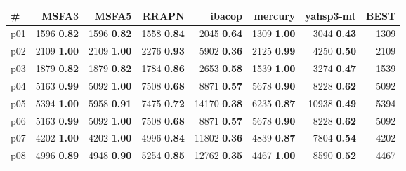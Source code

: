 \begin{tabular}{lrrrrrrr}
\toprule
\textbf{\#} & \textbf{MSFA3} & \textbf{MSFA5} & \textbf{RRAPN} & \textbf{ibacop} & \textbf{mercury} & \textbf{yahsp3-mt} & \textbf{BEST}\\
\midrule
\multicolumn{1}{l|}{p01} & {\footnotesize 1596} \textbf{0.82} & {\footnotesize 1596} \textbf{0.82} & {\footnotesize 1558} \textbf{0.84} & {\footnotesize 2045} \textbf{0.64} & {\footnotesize 1309} \textbf{1.00} & {\footnotesize 3044} \textbf{0.43} & \multicolumn{1}{|r}{1309}\\
\multicolumn{1}{l|}{p02} & {\footnotesize 2109} \textbf{1.00} & {\footnotesize 2109} \textbf{1.00} & {\footnotesize 2276} \textbf{0.93} & {\footnotesize 5902} \textbf{0.36} & {\footnotesize 2125} \textbf{0.99} & {\footnotesize 4250} \textbf{0.50} & \multicolumn{1}{|r}{2109}\\
\multicolumn{1}{l|}{p03} & {\footnotesize 1879} \textbf{0.82} & {\footnotesize 1879} \textbf{0.82} & {\footnotesize 1784} \textbf{0.86} & {\footnotesize 2653} \textbf{0.58} & {\footnotesize 1539} \textbf{1.00} & {\footnotesize 3274} \textbf{0.47} & \multicolumn{1}{|r}{1539}\\
\multicolumn{1}{l|}{p04} & {\footnotesize 5163} \textbf{0.99} & {\footnotesize 5092} \textbf{1.00} & {\footnotesize 7508} \textbf{0.68} & {\footnotesize 8871} \textbf{0.57} & {\footnotesize 5678} \textbf{0.90} & {\footnotesize 8228} \textbf{0.62} & \multicolumn{1}{|r}{5092}\\
\multicolumn{1}{l|}{p05} & {\footnotesize 5394} \textbf{1.00} & {\footnotesize 5958} \textbf{0.91} & {\footnotesize 7475} \textbf{0.72} & {\footnotesize 14170} \textbf{0.38} & {\footnotesize 6235} \textbf{0.87} & {\footnotesize 10938} \textbf{0.49} & \multicolumn{1}{|r}{5394}\\
\multicolumn{1}{l|}{p06} & {\footnotesize 5163} \textbf{0.99} & {\footnotesize 5092} \textbf{1.00} & {\footnotesize 7508} \textbf{0.68} & {\footnotesize 8871} \textbf{0.57} & {\footnotesize 5678} \textbf{0.90} & {\footnotesize 8228} \textbf{0.62} & \multicolumn{1}{|r}{5092}\\
\multicolumn{1}{l|}{p07} & {\footnotesize 4202} \textbf{1.00} & {\footnotesize 4202} \textbf{1.00} & {\footnotesize 4996} \textbf{0.84} & {\footnotesize 11802} \textbf{0.36} & {\footnotesize 4839} \textbf{0.87} & {\footnotesize 7804} \textbf{0.54} & \multicolumn{1}{|r}{4202}\\
\multicolumn{1}{l|}{p08} & {\footnotesize 4996} \textbf{0.89} & {\footnotesize 4948} \textbf{0.90} & {\footnotesize 5254} \textbf{0.85} & {\footnotesize 12762} \textbf{0.35} & {\footnotesize 4467} \textbf{1.00} & {\footnotesize 8590} \textbf{0.52} & \multicolumn{1}{|r}{4467}\\

\end{tabular}
